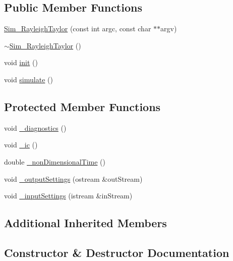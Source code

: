 \subsection*{Public Member Functions}
\begin{DoxyCompactItemize}
\item 
\hyperlink{class_sim___rayleigh_taylor_ac436022e7df3ea0d9e5d6a4ac5cee50e}{Sim\+\_\+\+Rayleigh\+Taylor} (const int argc, const char $\ast$$\ast$argv)
\item 
\hyperlink{class_sim___rayleigh_taylor_a5ac373f8be0aff9626c4a14f21182bb3}{$\sim$\+Sim\+\_\+\+Rayleigh\+Taylor} ()
\item 
void \hyperlink{class_sim___rayleigh_taylor_a55ee82000e3f09d000473f7dd270f450}{init} ()
\item 
void \hyperlink{class_sim___rayleigh_taylor_adfb302f9aaa1b4162bd99aa08888ca72}{simulate} ()
\end{DoxyCompactItemize}
\subsection*{Protected Member Functions}
\begin{DoxyCompactItemize}
\item 
void \hyperlink{class_sim___rayleigh_taylor_ad7b306abb6957e1b58064049d6faa44d}{\+\_\+diagnostics} ()
\item 
void \hyperlink{class_sim___rayleigh_taylor_a022e27f449e4fde53ed3f5e9fba7d5bc}{\+\_\+ic} ()
\item 
double \hyperlink{class_sim___rayleigh_taylor_ae18086f424f7a7927a6e6f1ece1a0bd7}{\+\_\+non\+Dimensional\+Time} ()
\item 
void \hyperlink{class_sim___rayleigh_taylor_a750e5b6f98b4c796479ebf2ac99c68fd}{\+\_\+output\+Settings} (ostream \&out\+Stream)
\item 
void \hyperlink{class_sim___rayleigh_taylor_a2a7a60af324a2c9f1b935c62b48a10ca}{\+\_\+input\+Settings} (istream \&in\+Stream)
\end{DoxyCompactItemize}
\subsection*{Additional Inherited Members}


\subsection{Constructor \& Destructor Documentation}
\hypertarget{class_sim___rayleigh_taylor_ac436022e7df3ea0d9e5d6a4ac5cee50e}{}

